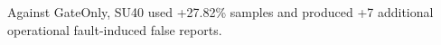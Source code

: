 Against GateOnly, SU40 used +27.82\% samples and produced +7 additional operational fault-induced false reports.
